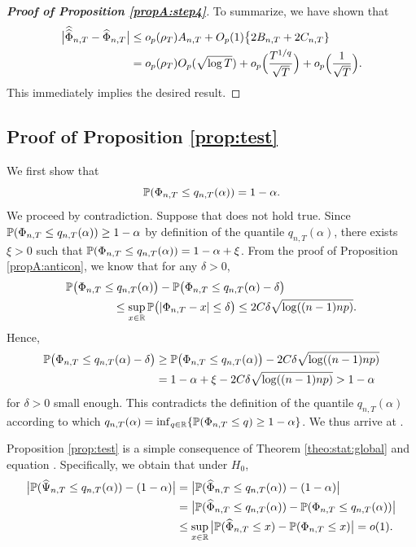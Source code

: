 \documentclass[12pt]{article}
\makeatletter
\renewcommand{\eqref}[1]{\tagform@{\ref{#1}}}
\makeatother
\begin{document}
\begin{proof}[\textnormal{\textbf{Proof of Proposition \ref{propA:step4}}}]
To summarize, we have shown that 
\begin{align*}
\big| \widehat{\widehat{\Phi}}_{n, T} - \widehat{\Phi}_{n, T} \big| 
 & \le o_p( \rho_T) A_{n,T} + O_p(1) \big\{ 2B_{n,T} + 2C_{n,T} \} \\
 & = o_p( \rho_T) O_p(\sqrt{\log T}) + o_p \Big( \frac{T^{1/q}}{\sqrt{T}} \Big) + o_p \Big( \frac{1}{\sqrt{T}} \Big).
\end{align*}
This immediately implies the desired result. 
\end{proof}



\subsection*{Proof of Proposition \ref{prop:test}}


We first show that 
\begin{equation}\label{eq:quant-exact}
\mathbb{P}(\Phi_{n,T} \le q_{n,T}(\alpha)) = 1 - \alpha. 
\end{equation}
We proceed by contradiction. Suppose that \eqref{eq:quant-exact} does not hold true. Since $\mathbb{P}(\Phi_{n,T} \le q_{n,T}(\alpha)) \ge 1 - \alpha$ by definition of the quantile $q_{n,T}(\alpha)$, there exists $\xi > 0$ such that $\mathbb{P}(\Phi_{n,T} \le q_{n,T}(\alpha)) = 1-\alpha + \xi$. From the proof of Proposition \ref{propA:anticon}, we know that for any $\delta > 0$, 
\begin{align*}
\mathbb{P} \big(\Phi_{n,T} & \le q_{n,T}(\alpha)\big) - \mathbb{P}\big(\Phi_{n,T} \le q_{n,T}(\alpha) - \delta\big) \\
 & \quad \le \sup_{x \in \mathbb{R}} \mathbb{P} \big(|\Phi_{n,T} - x| \le \delta \big)  \le 2 C \delta \sqrt{\log((n-1)np)}. 
\end{align*}
Hence, 
\begin{align*}
\mathbb{P} \big(\Phi_{n,T} \le q_{n,T}(\alpha) - \delta \big) 
 & \ge \mathbb{P}\big(\Phi_{n,T} \le q_{n,T}(\alpha) \big) - 2 C \delta \sqrt{\log((n-1)np)} \\
 & = 1-\alpha + \xi - 2 C \delta \sqrt{\log((n-1)np)} > 1-\alpha
\end{align*}
for $\delta > 0$ small enough. This contradicts the definition of the quantile $q_{n,T}(\alpha)$ according to which $q_{n,T}(\alpha) = \inf_{q \in \mathbb{R}} \{ \mathbb{P}(\Phi_{n,T} \le q) \ge 1-\alpha \}$. We thus arrive at \eqref{eq:quant-exact}. 


Proposition \ref{prop:test} is a simple consequence of Theorem \ref{theo:stat:global} and equation \eqref{eq:quant-exact}. Specifically, we obtain that under $H_0$, 
\begin{align*}
\big| \mathbb{P}(\widehat{\Psi}_{n, T} \le q_{n,T}(\alpha)) - (1-\alpha) \big| 
 & = \big| \mathbb{P}(\widehat{\Phi}_{n, T} \le q_{n,T}(\alpha)) - (1-\alpha) \big| \\
 & = \big| \mathbb{P}(\widehat{\Phi}_{n, T} \le q_{n,T}(\alpha)) - \mathbb{P}(\Phi_{n,T} \le q_{n,T}(\alpha)) \big| \\
 & \le \sup_{x \in \mathbb{R}} \big| \mathbb{P}(\widehat{\Phi}_{n, T} \le x) - \mathbb{P}(\Phi_{n,T} \le x) \big| = o(1). 
\end{align*}
\end{document}
